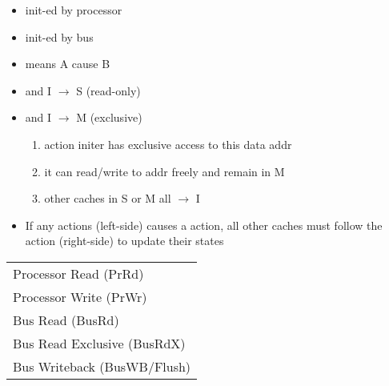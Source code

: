 \begin{minipage}{0.5\linewidth}
  \begin{itemize}
  \item {} init-ed by processor
  \item {} init-ed by bus
  \item {} means A cause B
  \item {} and \textsf{I} $\to$ \textsf{S} (read-only)
  \item {} and \textsf{I} $\to$ \textsf{M} (exclusive)
    \begin{enumerate}
    \item action initer has exclusive access to this data addr
    \item it can read/write to addr freely and remain in \textsf{M}
    \item other caches in \textsf{S} or \textsf{M} all $\to$ \textsf{I}
    \end{enumerate}
  \item If any  actions (left-side) causes a  action, all other caches must follow the  action (right-side) to update their states
  \end{itemize}
  \begin{tabular}{l}
    \hline
    Processor Read (PrRd)\\
    Processor Write (PrWr)\\
    Bus Read (BusRd)\\
    Bus Read Exclusive (BusRdX)\\
    Bus Writeback (BusWB/Flush)\\
    \hline
  \end{tabular}
\end{minipage}

